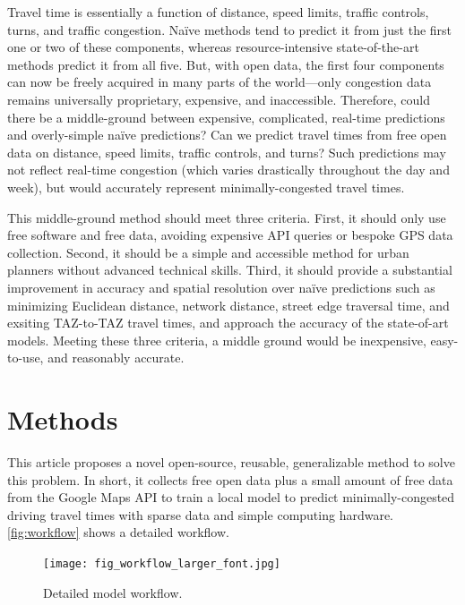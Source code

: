\documentclass[12pt,letterpaper]{article} %
\begin{document}
Travel time is essentially a function of distance, speed limits, traffic controls, turns, and traffic congestion. Naïve methods tend to predict it from just the first one or two of these components, whereas resource-intensive state-of-the-art methods predict it from all five. But, with open data, the first four components can now be freely acquired in many parts of the world---only congestion data remains universally proprietary, expensive, and inaccessible. Therefore, could there be a middle-ground between expensive, complicated, real-time predictions and overly-simple naïve predictions? Can we predict travel times from free open data on distance, speed limits, traffic controls, and turns? Such predictions may not reflect real-time congestion (which varies drastically throughout the day and week), but would accurately represent minimally-congested travel times.

This middle-ground method should meet three criteria. First, it should only use free software and free data, avoiding expensive API queries or bespoke GPS data collection. Second, it should be a simple and accessible method for urban planners without advanced technical skills. Third, it should provide a substantial improvement in accuracy and spatial resolution over naïve predictions such as minimizing Euclidean distance, network distance, street edge traversal time, and exsiting TAZ-to-TAZ travel times, and approach the accuracy of the state-of-art models. Meeting these three criteria, a middle ground would be inexpensive, easy-to-use, and reasonably accurate.

\section{Methods}

This article proposes a novel open-source, reusable, generalizable method to solve this problem. In short, it collects free open data plus a small amount of free data from the Google Maps API to train a local model to predict minimally-congested driving travel times with sparse data and simple computing hardware. \autoref{fig:workflow} shows a detailed workflow.

\begin{figure}[bt!]
    \centering
    \texttt{[image: fig\_workflow\_larger\_font.jpg]}
    \caption{Detailed model workflow.}\label{fig:workflow}
\end{figure}
\end{document}

